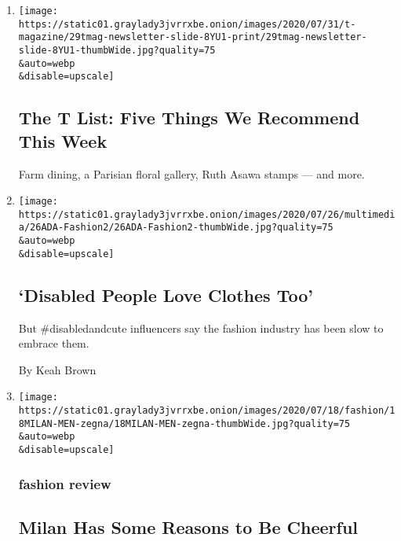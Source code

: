 \begin{enumerate}
\def\labelenumi{\arabic{enumi}.}
\item
  \href{/2020/07/30/t-magazine/the-t-list-five-things-we-recommend-this-week.html}{}

  \texttt{[image: https://static01.graylady3jvrrxbe.onion/images/2020/07/31/t-magazine/29tmag-newsletter-slide-8YU1-print/29tmag-newsletter-slide-8YU1-thumbWide.jpg?quality=75\\\&auto=webp\\\&disable=upscale]}

  \hypertarget{the-t-list-five-things-we-recommend-this-week}{%
  \subsection{The T List: Five Things We Recommend This
  Week}\label{the-t-list-five-things-we-recommend-this-week}}

  Farm dining, a Parisian floral gallery, Ruth Asawa stamps --- and
  more.
\item
  \href{/2020/07/26/style/functional-fashion.html}{}

  \texttt{[image: https://static01.graylady3jvrrxbe.onion/images/2020/07/26/multimedia/26ADA-Fashion2/26ADA-Fashion2-thumbWide.jpg?quality=75\\\&auto=webp\\\&disable=upscale]}

  \hypertarget{disabled-people-love-clothes-too}{%
  \subsection{`Disabled People Love Clothes
  Too'}\label{disabled-people-love-clothes-too}}

  But \#disabledandcute influencers say the fashion industry has been
  slow to embrace them.

  By Keah Brown
\item
  \href{/2020/07/17/style/mens-fashion-milan-provides-reasons-to-be-cheerful.html}{}

  \texttt{[image: https://static01.graylady3jvrrxbe.onion/images/2020/07/18/fashion/18MILAN-MEN-zegna/18MILAN-MEN-zegna-thumbWide.jpg?quality=75\\\&auto=webp\\\&disable=upscale]}

  \hypertarget{fashion-review}{%
  \subsubsection{fashion review}\label{fashion-review}}

  \hypertarget{milan-has-some-reasons-to-be-cheerful}{%
  \subsection{Milan Has Some Reasons to Be
  Cheerful}\label{milan-has-some-reasons-to-be-cheerful}}


\end{enumerate}
